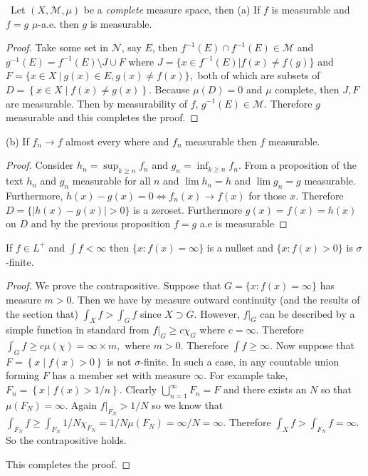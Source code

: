 \documentclass[11pt]{amsart}
\theoremstyle{definition}
\numberwithin{theorem}{section}
\numberwithin{definition}{section}
\numberwithin{equation}{section}
\newcommand{\set}[1]{ \left\{ #1 \right\} }
\def\scriptm{{\mathcal M}}
\def\scriptn{{\mathcal N}}
\begin{document}
 \medskip {}\ Let $(X, \scriptm, \mu)$ be a \emph{complete} measure space, then
 (a) If $f$ is measurable and $f=g$ $\mu$-a.e. then $g$ is measurable.
 \begin{proof}
 	Take some set in $\scriptn$,  say $E$, then $f^{-1}(E) \cap f^{-1}(E) \in \scriptm$ and $g^{-1}(E) = f^{-1}(E) \setminus J \cup F$ where
 	$J = \{x \in f^{-1}(E)\mathrel{}|\mathrel{}f(x) \neq f(g)\}$ and $F = \{x \in X\ |\ g(x) \in E, g(x) \neq f(x)\},$ both of which are subsets of $D = \set{x \in X\mathrel{}\middle|\mathrel{}f(x) \neq g(x)}.$ Because $\mu(D) = 0$ and $\mu$ complete, then $J, F$ are measurable. Then by measurability of $f$, $g^{-1}(E) \in \scriptm$. Therefore $g$ measurable and this completes the proof.
  \end{proof}
  (b) If $f_n \to f$ almost every where and $f_n$ measurable then $f$ measurable.
  \begin{proof}
  	Consider $h_n = \sup_{k\geq n} f_n$ and $g_n = \inf_{k\geq n} f_n$. From a proposition of the text $h_n$ and $g_n$ measurable for all $n$ and $\lim h_n = h$ and $\lim g_n = g$ measurable. Furthermore, $h(x)-g(x) = 0 \iff f_n(x) \to f(x)$ for those $x$. Therefore $D = \{|h(x)-g(x)| > 0\}$ is a zeroset. 
  	Furthermore $g(x) = f(x) =h(x)$ on $D$ and by the previous proposition $f = g$ a.e is measurable
  	\end{proof}
 \medskip {} If $f \in L^+$ and $\int f < \infty$ then $\{x:f(x) = \infty\}$ is a nullset and $\{x : f(x) > 0\}$ is $\sigma$-finite.
  \begin{proof}
    We prove the contrapositive. Suppose that $G = \{x:f(x) = \infty\}$ has measure $m > 0$. Then we have by measure outward continuity (and the results of the section that) $\int_X f > \int_G f$ since $X \supset G$. However, $f|_G$ can be described by a simple function in standard from $f|_G \geq c\chi_G$ where $c = \infty$. Therefore $\int_G f \geq c\mu(\chi) = \infty\times m, $ where $m > 0$. Therefore $\int f \geq \infty.$ Now suppose that
     $F = \set{x\mathrel{}\middle|\mathrel{}f(x) > 0}$ is not $\sigma$-finite. In such a case, in any countable union forming $F$ has a member set with measure $\infty$. For example take, $F_n = \set{x\mathrel{}\middle|\mathrel{}f(x) > 1/n}$. Clearly $\bigcup_{n=1}^\infty F_n = F$ and there exists an $N$ so that $\mu(F_N) = \infty$. Again $f|_{F_N} > 1/N$ so we know that $\int_{F_N} f \geq \int_{F_N} 1/N\chi_{F_N} = 1/N\mu(F_N) = \infty/N = \infty$. Therefore $\int_X f > \int_{F_N} f = \infty.$ So the contrapositive holds.

     This completes the proof.
  \end{proof} 
\end{document}
